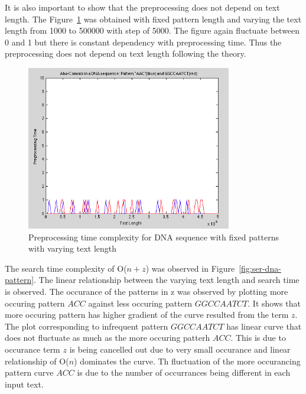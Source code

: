 \documentclass[paper=a4, fontsize=11pt]{scrartcl} %
\numberwithin{equation}{section} %
\numberwithin{figure}{section} %
\numberwithin{table}{section} %
\begin{document}
It is also important to show that the preprocessing does not depend on text length. The Figure~\ref{fig:pre-fixed-pattern} was obtained with fixed pattern length and varying the text length from 1000 to 500000 with step of 5000. The figure again fluctuate between 0 and 1 but there is constant dependency with preprocessing time. Thus the preprocessing does not depend on text length following the theory.

\begin{figure}[h!]
\centering
\includegraphics[width=0.8\textwidth]{figures/pre-DNA-fixed-pattern.png}
\caption{Preprocessing time complexity for DNA sequence with fixed patterns with varying text length}
\label{fig:pre-fixed-pattern}
\end{figure}

The search time complexity of O($n + z$) was observed in Figure~\ref{fig:ser-dna-pattern}. The linear relationship between the varying text length and search time is observed. The occurance of the patterns in z was observed by plotting more occuring pattern $ACC$ against less occuring pattern $GGCCAATCT$. It shows that more occuring pattern has higher gradient of the curve resulted from the term $z$. The plot corresponding to infrequent pattern $GGCCAATCT$ has linear curve that does not fluctuate as much as the more occuring patterh $ACC$. This is due to occurance term $z$ is being cancelled out due to very small occurance and linear relationship of O($n$) dominates the curve. Th fluctuation of the more occurancing pattern curve $ACC$ is due to the number of occurrances being different in each input text. 
\end{document}

